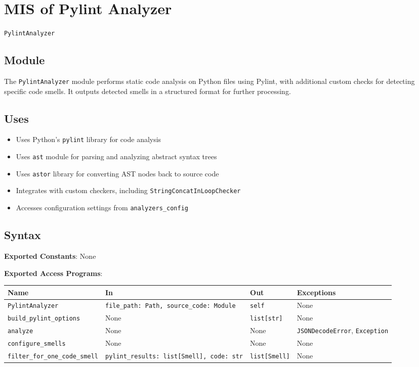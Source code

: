 \documentclass[12pt, titlepage]{article}
\begin{document}
  
  
\newpage

\section{MIS of Pylint Analyzer} \label{mis:PylintAnalyzer}

\texttt{PylintAnalyzer}

\subsection{Module}

The \texttt{PylintAnalyzer} module performs static code analysis on Python files using Pylint, with additional custom checks for detecting specific code smells. It outputs detected smells in a structured format for further processing.

\subsection{Uses}
\begin{itemize}
  \item Uses Python's \texttt{pylint} library for code analysis
  \item Uses \texttt{ast} module for parsing and analyzing abstract syntax trees
  \item Uses \texttt{astor} library for converting AST nodes back to source code
  \item Integrates with custom checkers, including \texttt{StringConcatInLoopChecker}
  \item Accesses configuration settings from \texttt{analyzers\_config}
\end{itemize}

\subsection{Syntax}
\noindent
\textbf{Exported Constants}: None

\noindent
\textbf{Exported Access Programs}:\\
{\footnotesize
\begin{tabularx}{\linewidth}{|
    l|
    >{\raggedright\arraybackslash}X|
    l|
    l|}
  \hline
  \textbf{Name} & \textbf{In} & \textbf{Out} & \textbf{Exceptions} \\\hline
  \texttt{PylintAnalyzer} & \texttt{file\_path: Path, source\_code: Module} & \texttt{self} & None \\
  \hline
  \texttt{build\_pylint\_options} & None & \texttt{list[str]} & None \\
  \hline
  \texttt{analyze} & None & None & \texttt{JSONDecodeError}, \texttt{Exception} \\
  \hline
  \texttt{configure\_smells} & None & None & None \\
  \hline
  \texttt{filter\_for\_one\_code\_smell} & \texttt{pylint\_results: list[Smell], code: str} & \texttt{list[Smell]} & None \\
  \hline
\end{tabularx}
}
\end{document}
